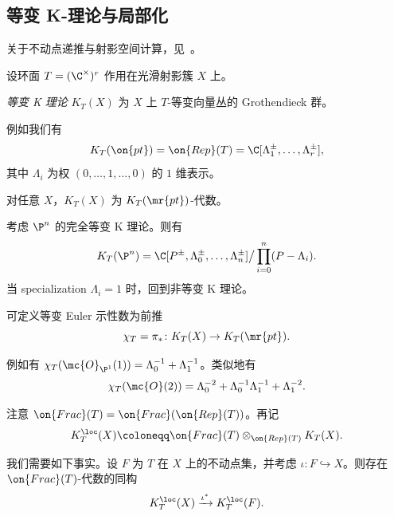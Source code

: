 \subsection{等变 K-理论与局部化}%
\label{sub:Equivariant K-theory and localization}

关于不动点递推与射影空间计算，见~\cite{GiventalK2}。

设环面 \(T = (\C^{\times})^r\) 作用在光滑射影簇 \(X\) 上。

\begin{defn}
    \textit{等变 K 理论} \(K_T(X)\) 为 \(X\) 上 \(T\)-等变向量丛的 Grothendieck 群。
\end{defn}

\begin{exm}
    例如我们有
    \[ K_T(\on{pt}) = \on{Rep}(T) = \C[\Lambda_1^{\pm}, \ldots, \Lambda_r^{\pm}], \]
    其中 \(\Lambda_i\) 为权 \((0, \ldots, 1, \ldots, 0)\) 的 \(1\) 维表示。
\end{exm}

\begin{rmk}
    对任意 \(X\)，\(K_T(X)\) 为 \(K_T(\mr{pt})\)-代数。
\end{rmk}

\begin{exm}
    考虑 \(\P^n\) 的完全等变 K 理论。则有
    \[ K_T(\P^n) = \C[P^{\pm}, \Lambda_0^{\pm}, \ldots, \Lambda_n^{\pm}] \big/ \prod_{i=0}^n (P-\Lambda_i). \]
    当 specialization \(\Lambda_i = 1\) 时，回到非等变 K 理论。
\end{exm}

\begin{defn}
    可定义等变 Euler 示性数为前推
    \[ \chi_T = \pi_* \colon K_T(X) \to K_T(\mr{pt}). \]
\end{defn}

\begin{exm}
    例如有 \(\chi_T(\mc{O}_{\P^1}(1)) = \Lambda_0^{-1} + \Lambda_1^{-1}\)。类似地有
    \[ \chi_T(\mc{O}(2)) = \Lambda_0^{-2} + \Lambda_0^{-1} \Lambda_1^{-1} + \Lambda_1^{-2}. \]
\end{exm}

\begin{notn}
    注意 \(\on{Frac}(T) = \on{Frac}(\on{Rep}(T))\)。再记
    \[ K_T^{\loc}(X) \coloneqq \on{Frac}(T) \otimes_{\on{Rep}(T)} K_T(X). \]
\end{notn}

我们需要如下事实。设 \(F\) 为 \(T\) 在 \(X\) 上的不动点集，并考虑 \(\iota \colon F \hookrightarrow X\)。则存在 \(\on{Frac}(T)\)-代数的同构
\[ K_T^{\loc}(X) \xrightarrow{\iota^*} K_T^{\loc}(F). \]

